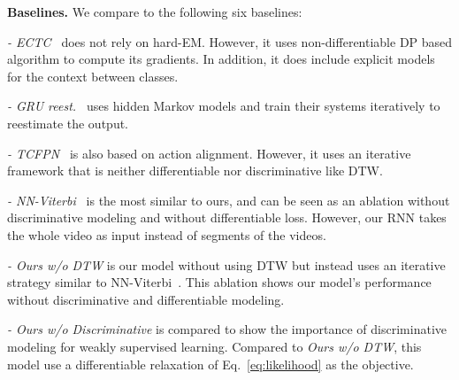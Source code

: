 \documentclass[10pt,twocolumn,letterpaper]{article}
\newcommand{\dttw}{DTW\xspace}
\newcommand{\eqnref}[1]{{Eq.\ \eqref{eq:#1}}}
\begin{document}
\vspace{1mm}
{\noindent \bf Baselines.} We compare to the following six baselines:

{\noindent \it  - ECTC~\cite{huang2016connectionist}} does not rely on hard-EM. However, it uses non-differentiable DP based algorithm to compute its gradients. In addition, it does
include explicit models for the context between classes.

{\noindent \it  - GRU reest.~\cite{richard2017weakly}}  uses hidden Markov models and train their systems iteratively to reestimate the output. 

{\noindent \it  - TCFPN~\cite{ding2018weakly}}  is also based on action alignment. However, it uses an iterative framework that is neither differentiable nor discriminative like \dttw.

{\noindent \it  - NN-Viterbi~\cite{richard2018neuralnetwork}} is the most similar to ours, and can be seen as an ablation without discriminative modeling and without differentiable loss. However, our RNN takes the whole video as input instead of segments of the videos.

{\noindent \it  - Ours w/o \dttw} is our model without using \dttw but instead uses an iterative strategy similar to NN-Viterbi~\cite{richard2018neuralnetwork}. This ablation shows our model's performance without discriminative and differentiable modeling.

{\noindent \it  - Ours w/o Discriminative} is compared to show the importance of discriminative modeling for weakly supervised learning. Compared to \emph{Ours w/o \dttw}, this model use a differentiable relaxation of \eqnref{likelihood} as the objective. 
\end{document}
